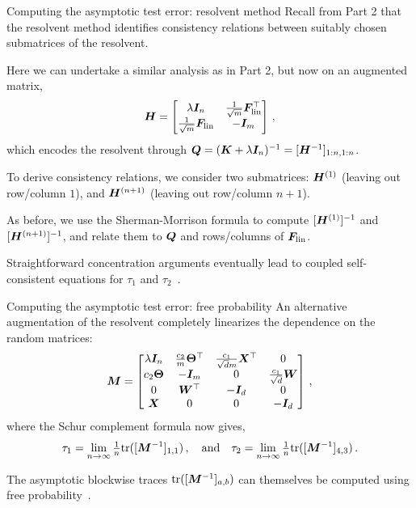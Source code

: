 \documentclass[10pt, aspectratio=169]{beamer}
\begin{document}
\begin{frame}[t]{Computing the asymptotic test error: resolvent method}
Recall from Part 2 that the resolvent method identifies consistency relations between suitably chosen submatrices of the resolvent.

Here we can undertake a similar analysis as in Part 2, but now on an augmented matrix,
$$ {\boldsymbol H} = \begin{bmatrix}
    \lambda {\boldsymbol I}_n        &    \frac{1}{\sqrt{m}}{\boldsymbol F}_{\text{lin}}^\top  \\
    \frac{1}{\sqrt{m}}{\boldsymbol F}_{\text{lin}}  &   -{\boldsymbol I}_m
    \end{bmatrix}\,,
$$
which encodes the resolvent through ${\boldsymbol Q} = ({\boldsymbol K} + \lambda {\boldsymbol I}_n)^{-1} = [{\boldsymbol H}^{-1}]_{1:n,1:n}$.
\pause

To derive consistency relations, we consider two submatrices: ${\boldsymbol H}^{(1)}$ (leaving out row/column $1$), and ${\boldsymbol H}^{(n+1)}$ (leaving out row/column $n+1$).

As before, we use the Sherman-Morrison formula to compute $[{\boldsymbol H}^{(1)}]^{-1}$ and $[{\boldsymbol H}^{(n+1)}]^{-1}$, and relate them to ${\boldsymbol Q}$ and rows/columns of ${\boldsymbol F}_\text{lin}$.

Straightforward concentration arguments eventually lead to coupled self-consistent equations for $\tau_1$ and $\tau_2$~\citep{adlam2019random}.
\end{frame}

\begin{frame}[t]{Computing the asymptotic test error: free probability}
An alternative augmentation of the resolvent completely linearizes the dependence on the random matrices:
$$  {\boldsymbol M} = \begin{bmatrix}
        \lambda {\boldsymbol I}_n & \tfrac{c_2}{m}\bm{\Theta}^\top & \tfrac{c_1}{\sqrt{d} m} {\boldsymbol X}^\top & 0 \\
        c_2 \bm{\Theta} & -{\boldsymbol I}_m & 0 & \tfrac{c_1}{\sqrt{d}} {\boldsymbol W} \\
        0 & {\boldsymbol W}^\top & -{\boldsymbol I}_d & 0 \\
        {\boldsymbol X} & 0 & 0 & -{\boldsymbol I}_d
        \end{bmatrix}\,,
$$
where the Schur complement formula now gives,
$$\tau_1 = \lim_{n\to\infty} \tfrac{1}{n}\text{tr} ([{\boldsymbol M}^{-1}]_{1,1})\,,\quad\text{and}\quad \tau_2 = \lim_{n\to\infty} \tfrac{1}{n}\text{tr}( [{\boldsymbol M}^{-1}]_{4,3})\,.$$

The asymptotic blockwise traces $\text{tr}([{\boldsymbol M}^{-1}]_{a,b})$ can themselves be computed using free probability~\citep{adlam2020neural}.
\end{frame}
\end{document}
